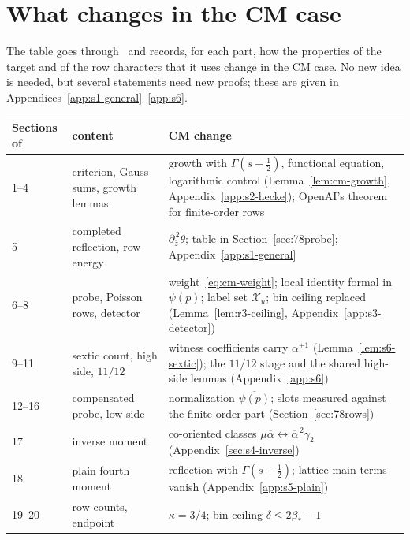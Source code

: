 \documentclass[11pt]{article}
\numberwithin{equation}{section}
\begin{document}
\section{What changes in the CM case}\label{sec:78status}
The table goes through~\cite{OAI78} and records, for each part, how the properties of the target and of the row
characters that it uses change in the CM case. No new idea is needed, but several statements need new proofs;
these are given in Appendices~\ref{app:s1-general}--\ref{app:s6}.
\begin{center}
\small
\begin{tabular}{p{2.7cm}p{4.6cm}p{7.2cm}}
\toprule
Sections of~\cite{OAI78} & content & CM change\\\midrule
1--4 & criterion, Gauss sums, growth lemmas & growth with $\Gamma(s+\frac12)$, functional equation, logarithmic
 control (Lemma~\ref{lem:cm-growth}, Appendix~\ref{app:s2-hecke}); OpenAI's theorem for finite-order rows\\
5 & completed reflection, row energy & $\partial_{\bar z}^{\,2}\theta$; table in Section~\ref{sec:78probe};
 Appendix~\ref{app:s1-general}\\
6--8 & probe, Poisson rows, detector & weight~\eqref{eq:cm-weight}; local identity formal in $\psi(p)$;
 label set $\mathcal X_u$; bin ceiling \cite[Section~8.1]{OAI78} replaced (Lemma~\ref{lem:r3-ceiling},
 Appendix~\ref{app:s3-detector})\\
9--11 & sextic count, high side, $11/12$ & witness coefficients carry $\alpha^{\pm1}$
 (Lemma~\ref{lem:s6-sextic}); the $11/12$ stage and the shared high-side lemmas (Appendix~\ref{app:s6})\\
12--16 & compensated probe, low side & normalization $\overline{\psi(p)}$; slots measured against the
 finite-order part (Section~\ref{sec:78rows})\\
17 & inverse moment & co-oriented classes $\mu\overline\alpha\leftrightarrow\overline\alpha^{\,2}\gamma_2$
 (Appendix~\ref{sec:s4-inverse})\\
18 & plain fourth moment & reflection with $\Gamma(s+\frac12)$; lattice main terms vanish
 (Appendix~\ref{app:s5-plain})\\
19--20 & row counts, endpoint & $\kappa=3/4$; bin ceiling $\delta\le2\beta_*-1$\\\bottomrule
\end{tabular}
\end{center}
\end{document}
